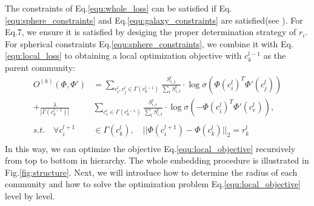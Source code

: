 \documentclass{article}
\theoremstyle{definition}
\begin{document}
	 The constraints of Eq.\ref{equ:whole_loss} can be satisfied if Eq.\ref{equ:sphere_constraints} and Eq.\ref{equ:galaxy_constraints} are satisfied(see ).
	 For Eq.7, we ensure it is satisfied by desiging the proper determination strategy of $r_i$. For spherical constraints Eq.\ref{equ:sphere_constraints}, we combine it with Eq.\ref{equ:local_loss} to obtaining a local optimization objective with $c_k^{l-1}$ as the parent community: 
	  \begin{equation}
	  \label{equ:local_objective}
	  \begin{split}
	  O^{(k)}(\Phi, \Phi') & = \sum_{c_i^l, c_j^l \in \Gamma(c_k^{l-1})} \frac{S_{i,j}^l}{\sum_t S_{i, t}^l} \cdot \log{\sigma(\Phi(c_i^l)^T \Phi'(c_j^l))} \\
		 + \frac{\lambda}{|\Gamma(c_k^{l-1})|}&\sum_{c_e^l \in \Gamma(c_k^{l-1})} \frac{S_{i, e}^l}{\sum_t S_{i, t}^l} \cdot \log{\sigma(-\Phi(c_i^l)^T \Phi'(c_e^l))}, \\
		 \\
		s.t. \quad \forall c_i^{l+1} & \in \Gamma(c_k^l),\quad || \Phi(c_i^{l+1})  - \Phi(c_k^l)||_2= r_k^l \\
	  \end{split}
	  \end{equation}
	 In this way, we can optimize the objective Eq.\ref{equ:local_objective} recursively from top to bottom in hierarchy. The whole embedding procedure is illustrated in Fig.\ref{fig:structure}. Next, we will introduce how to determine the radius of each community and how to solve the optimization problem Eq.\ref{equ:local_objective} level by level.
	 
\end{document}
